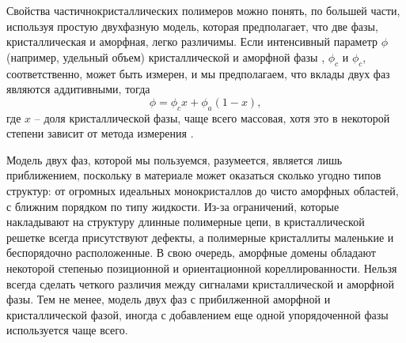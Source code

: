 Свойства частичнокристаллических полимеров можно понять, по большей части, используя простую двухфазную модель, которая предполагает, что две фазы, кристаллическая и аморфная, легко различимы. Если интенсивный параметр  $\phi$ (например, удельный объем) кристаллической и аморфной фазы , $\phi_c$ и $\phi_c$, соответственно, может быть измерен, и мы предполагаем, что вклады двух фаз являются аддитивными, тогда
\[ 
\phi = \phi_c x + \phi_a(1-x),
\]
где $x$  -- доля кристаллической фазы, чаще всего массовая, хотя это в некоторой степени зависит от метода измерения \cite{cryst3}.
	
Модель двух фаз, которой мы пользуемся, разумеется, является лишь приближением, поскольку в материале может оказаться сколько угодно типов структур: от огромных идеальных монокристаллов до чисто аморфных областей, с ближним порядком по типу жидкости.
Из-за ограничений, которые накладывают на структуру длинные полимерные цепи, в кристаллической решетке всегда присутствуют дефекты, а полимерные кристаллиты маленькие и беспорядочно расположенные. В свою очередь, аморфные домены обладают некоторой степенью позиционной и ориентационной кореллированности.
Нельзя всегда сделать четкого различия между сигналами кристаллической и аморфной фазы. Тем не менее, модель двух фаз с прибилженной аморфной и кристаллической фазой, иногда с добавлением еще одной упорядоченной фазы используется чаще всего.